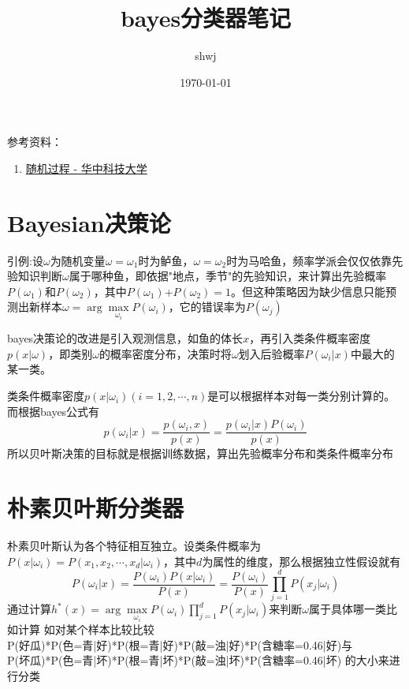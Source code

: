\documentclass[12pt, a4paper, oneside]{ctexart}
\title{bayes分类器笔记}
\author{shwj}
\date{\today}
\begin{document}
\maketitle



\par
参考资料：
\begin{enumerate}
    \item \href{https://www.bilibili.com/video/BV1g7411b7r2}{随机过程 - 华中科技大学} 
\end{enumerate}

\section{Bayesian决策论}
\par 
引例:设$\omega$为随机变量$\omega ={\omega}_1$时为鲈鱼，$\omega ={\omega}_2$时为马哈鱼，频率学派会仅仅依靠先验知识判断$\omega$属于哪种鱼，即依据"地点，季节"的先验知识，来计算出先验概率$P({\omega}_1)$和$P({\omega}_2)$，其中$P({\omega}_1)$+$P({\omega}_2)=1$。但这种策略因为缺少信息只能预测出新样本$\omega = \arg\max\limits_{{\omega}_i}P({\omega}_i)$，它的错误率为$P({\omega}_j)$
\par
bayes决策论的改进是引入观测信息，如鱼的体长$x$，再引入类条件概率密度$p(x|\omega)$，即类别$\omega$的概率密度分布，决策时将$\omega$划入后验概率$P({\omega}_i|x)$中最大的某一类。
\par
类条件概率密度$p(x|{\omega}_i) (i=1,2,\cdots,n)$是可以根据样本对每一类分别计算的。而根据bayes公式有
$$p({\omega}_i|x)=\frac{p({\omega}_i,x)}{p(x)}=\frac{p({\omega}_i|x)P({\omega}_i)}{p(x)}$$
所以贝叶斯决策的目标就是根据训练数据，算出先验概率分布和类条件概率分布
\section{朴素贝叶斯分类器}
\par 
朴素贝叶斯认为各个特征相互独立。设类条件概率为$P(x|{\omega}_i)=P(x_1,x_2,\cdots,x_d|{\omega}_i)$，其中$d$为属性的维度，那么根据独立性假设就有
$$P({\omega}_i|x)=\frac{P({\omega}_i)P(x|{\omega}_i)}{P(x)}=\frac{P({\omega}_i)}{P(x)} \prod_{j=1}^d{P(x_j|{\omega}_i)}$$
通过计算$h^*(x)= \arg\max\limits_{{\omega}_i}P({\omega}_i)\prod_{j=1}^d{P(x_j|{\omega}_i)}$来判断$\omega$属于具体哪一类比如计算
如对某个样本比较比较
\\ P(好瓜)*P(色=青|好)*P(根=青|好)*P(敲=浊|好)*P(含糖率=0.46|好)与
\\ P(坏瓜)*P(色=青|坏)*P(根=青|坏)*P(敲=浊|坏)*P(含糖率=0.46|坏)
的大小来进行分类
\end{document}
